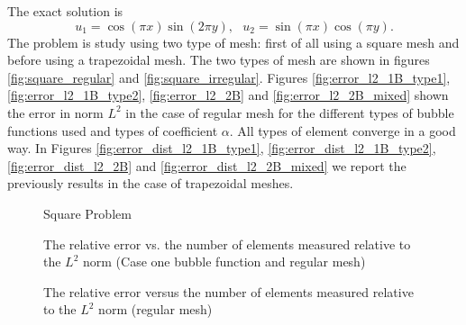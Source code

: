 \documentclass[preprint,12pt,authoryear]{elsarticle}
\begin{document}
The exact solution is
\begin{equation} \label{eq:exact_solution}
u_{1} = \cos (\pi x) \sin(2\pi y), \mbox{ } u_{2} = \sin(\pi x)\cos(\pi y). 
\end{equation} 
The problem is study using two type of mesh: first of all using a square mesh and before using a trapezoidal mesh. The two types of mesh are shown in figures \ref{fig:square_regular} and \ref{fig:square_irregular}.
Figures \ref{fig:error_l2_1B_type1}, \ref{fig:error_l2_1B_type2}, \ref{fig:error_l2_2B} and \ref{fig:error_l2_2B_mixed} shown the error in norm $L^{2}$ in the case of regular mesh for the different types of bubble functions used and types of coefficient $\alpha$. All types of element converge in a good way.
In Figures  \ref{fig:error_dist_l2_1B_type1}, \ref{fig:error_dist_l2_1B_type2}, \ref{fig:error_dist_l2_2B} and \ref{fig:error_dist_l2_2B_mixed} we report the previously results in the case of trapezoidal meshes. 
%
\begin{figure}[h!]
\begin{center}
\hspace{5pt}
\caption{Square Problem}
\end{center}
\end{figure}
\begin{figure}[h!]
\begin{center}
\caption{The relative error vs. the number of elements measured relative 
to the $L^{2}$ norm (Case one bubble function and regular mesh)}
\end{center}
\end{figure}
%
\begin{figure}[h!]
\begin{center}
\caption{The relative error versus the number of elements measured relative to the $L^{2}$ norm (regular mesh)}
\end{center}
\end{figure}
\end{document}
